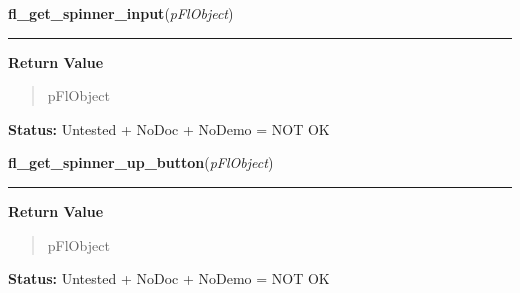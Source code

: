 \hspace{.8\funcindent}\begin{boxedminipage}{\funcwidth}

    \raggedright \textbf{fl\_get\_spinner\_input}(\textit{pFlObject})

    \vspace{-1.5ex}

    \rule{\textwidth}{0.5\fboxrule}
\setlength{\parskip}{2ex}
\setlength{\parskip}{1ex}
      \textbf{Return Value}
    \vspace{-1ex}

      \begin{quote}
      pFlObject

      \end{quote}

\textbf{Status:} Untested + NoDoc + NoDemo = NOT OK



    \end{boxedminipage}

    \label{xformslib:flspinner:fl_get_spinner_up_button}

    \vspace{0.5ex}

\hspace{.8\funcindent}\begin{boxedminipage}{\funcwidth}

    \raggedright \textbf{fl\_get\_spinner\_up\_button}(\textit{pFlObject})

    \vspace{-1.5ex}

    \rule{\textwidth}{0.5\fboxrule}
\setlength{\parskip}{2ex}
\setlength{\parskip}{1ex}
      \textbf{Return Value}
    \vspace{-1ex}

      \begin{quote}
      pFlObject

      \end{quote}

\textbf{Status:} Untested + NoDoc + NoDemo = NOT OK



    \end{boxedminipage}

    \label{xformslib:flspinner:fl_get_spinner_down_button}

